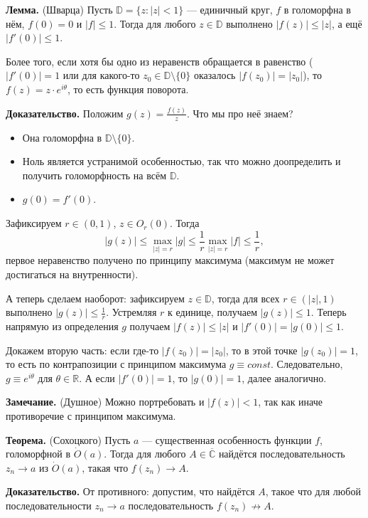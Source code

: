 \QED

\textbf{Лемма.} (Шварца) Пусть $\mathbb D = \{z: |z| < 1\}$ --- единичный круг, $f$ в голоморфна в нём, $f(0) = 0$ и $|f| \le 1$.
Тогда для любого $z \in \mathbb D$ выполнено $|f(z)| \le |z|$, а ещё $|f'(0)| \le 1$.

Более того, если хотя бы одно из неравенств обращается в равенство ($|f'(0)| = 1$ или для какого-то $z_0 \in \mathbb D \setminus \{0\}$ оказалось $|f(z_0)| = |z_0|$), то $f(z) = z \cdot e^{i\theta}$, то есть функция поворота.

\textbf{Доказательство.} Положим $g(z) = \frac{f(z)}{z}$. Что мы про неё знаем?
\begin{itemize}
    \item Она голоморфна в $\mathbb D \setminus \{0\}$.
    \item Ноль является устранимой особенностью, так что можно доопределить и получить голоморфность на всём $\mathbb D$.
    \item $g(0) = f'(0)$.
\end{itemize}
Зафиксируем $r \in (0, 1)$, $z \in O_r(0)$.
Тогда
\[
    |g(z)| \le \max_{|z| = r} |g| \le \frac{1}{r} \max_{|z| = r} |f| \le \frac{1}{r},
\]
первое неравенство получено по принципу максимума (максимум не может достигаться на внутренности).

А теперь сделаем наоборот: зафиксируем $z \in \mathbb D$, тогда для всех $r \in (|z|, 1)$ выполнено $|g(z)| \le \frac{1}{r}$.
Устремляя $r$ к единице, получаем $|g(z)| \le 1$.
Теперь напрямую из определения $g$ получаем $|f(z)| \le |z|$ и $|f'(0)| = |g(0)| \le 1$.

Докажем вторую часть: если где-то $|f(z_0)| = |z_0|$, то в этой точке $|g(z_0)| = 1$, то есть по контрапозиции с принципом максимума $g \equiv const$.
Следовательно, $g \equiv e^{i\theta}$ для $\theta \in \mathbb R$.
А если $|f'(0)| = 1$, то $|g(0)| = 1$, далее аналогично.

\QED

\textbf{Замечание.} (Душное) Можно портребовать и $|f(z)| < 1$, так как иначе противоречие с принципом максимума.

\textbf{Теорема.} (Сохоцкого) Пусть $a$ --- существенная особенность функции $f$, голоморфной в $\dot O(a)$.
Тогда для любого $A \in \overline{\mathbb C}$ найдётся последовательность $z_n \to a$ из $\dot O(a)$, такая что $f(z_n) \to A$.

\textbf{Доказательство.} От противного: допустим, что найдётся $A$, такое что для любой последовательности $z_n \to a$ последовательность $f(z_n) \not\to A$.

